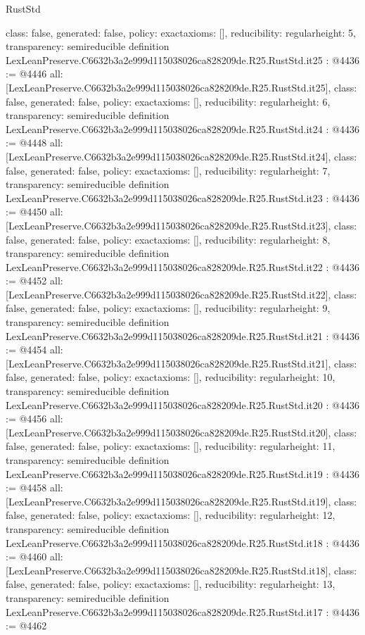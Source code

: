 \begin{lexlean}{RustStd}
\begin{coremodule}
{  class: false,
  generated: false,
  policy: exact{axioms: []},
  reducibility: regular{height: 5},
  transparency: semireducible
}
definition LexLeanPreserve.C6632b3a2e999d115038026ca828209de.R25.RustStd.it25 : @4436 := @4446 {
  all: [LexLeanPreserve.C6632b3a2e999d115038026ca828209de.R25.RustStd.it25],
  class: false,
  generated: false,
  policy: exact{axioms: []},
  reducibility: regular{height: 6},
  transparency: semireducible
}
definition LexLeanPreserve.C6632b3a2e999d115038026ca828209de.R25.RustStd.it24 : @4436 := @4448 {
  all: [LexLeanPreserve.C6632b3a2e999d115038026ca828209de.R25.RustStd.it24],
  class: false,
  generated: false,
  policy: exact{axioms: []},
  reducibility: regular{height: 7},
  transparency: semireducible
}
definition LexLeanPreserve.C6632b3a2e999d115038026ca828209de.R25.RustStd.it23 : @4436 := @4450 {
  all: [LexLeanPreserve.C6632b3a2e999d115038026ca828209de.R25.RustStd.it23],
  class: false,
  generated: false,
  policy: exact{axioms: []},
  reducibility: regular{height: 8},
  transparency: semireducible
}
definition LexLeanPreserve.C6632b3a2e999d115038026ca828209de.R25.RustStd.it22 : @4436 := @4452 {
  all: [LexLeanPreserve.C6632b3a2e999d115038026ca828209de.R25.RustStd.it22],
  class: false,
  generated: false,
  policy: exact{axioms: []},
  reducibility: regular{height: 9},
  transparency: semireducible
}
definition LexLeanPreserve.C6632b3a2e999d115038026ca828209de.R25.RustStd.it21 : @4436 := @4454 {
  all: [LexLeanPreserve.C6632b3a2e999d115038026ca828209de.R25.RustStd.it21],
  class: false,
  generated: false,
  policy: exact{axioms: []},
  reducibility: regular{height: 10},
  transparency: semireducible
}
definition LexLeanPreserve.C6632b3a2e999d115038026ca828209de.R25.RustStd.it20 : @4436 := @4456 {
  all: [LexLeanPreserve.C6632b3a2e999d115038026ca828209de.R25.RustStd.it20],
  class: false,
  generated: false,
  policy: exact{axioms: []},
  reducibility: regular{height: 11},
  transparency: semireducible
}
definition LexLeanPreserve.C6632b3a2e999d115038026ca828209de.R25.RustStd.it19 : @4436 := @4458 {
  all: [LexLeanPreserve.C6632b3a2e999d115038026ca828209de.R25.RustStd.it19],
  class: false,
  generated: false,
  policy: exact{axioms: []},
  reducibility: regular{height: 12},
  transparency: semireducible
}
definition LexLeanPreserve.C6632b3a2e999d115038026ca828209de.R25.RustStd.it18 : @4436 := @4460 {
  all: [LexLeanPreserve.C6632b3a2e999d115038026ca828209de.R25.RustStd.it18],
  class: false,
  generated: false,
  policy: exact{axioms: []},
  reducibility: regular{height: 13},
  transparency: semireducible
}
definition LexLeanPreserve.C6632b3a2e999d115038026ca828209de.R25.RustStd.it17 : @4436 := @4462 {
}
\end{coremodule}
\end{lexlean}
